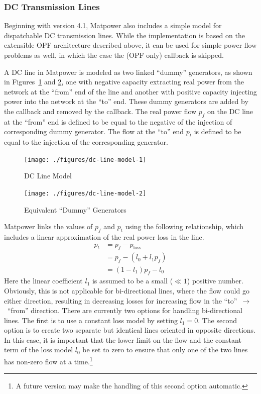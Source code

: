 \documentclass[12pt]{article}
\newcommand{\matpower}[0]{{\sc Matpower}}
\newcommand{\code}[1]{{\relsize{-0.5}{\tt{{#1}}}}}  %
\numberwithin{equation}{section}
\numberwithin{table}{section}
\numberwithin{figure}{section}
\begin{document}
\subsubsection{DC Transmission Lines}
\label{sec:dclines}

Beginning with version 4.1, \matpower{} also includes a simple model for dispatchable DC transmission lines. While the implementation is based on the extensible OPF architecture described above, it can be used for simple power flow problems as well, in which the case the (OPF only) \code{formulation} callback is skipped.

A DC line in \matpower{} is modeled as two linked ``dummy'' generators, as shown in Figures~\ref{fig:dcline_model1} and \ref{fig:dcline_model2}, one with negative capacity extracting real power from the network at the ``from'' end of the line and another with positive capacity injecting power into the network at the ``to'' end. These dummy generators are added by the \code{ext2int} callback and removed by the \code{int2ext} callback. The real power flow $p_f$ on the DC line at the ``from'' end is defined to be equal to the negative of the injection of corresponding dummy generator. The flow at the ``to'' end $p_t$ is defined to be equal to the injection of the corresponding generator.

\begin{figure}[tp]
  \centering
  \texttt{[image: ./figures/dc-line-model-1]}
  \caption{DC Line Model}
  \label{fig:dcline_model1}
\end{figure}

\begin{figure}[tp]
  \centering
  \texttt{[image: ./figures/dc-line-model-2]}
  \caption{Equivalent ``Dummy'' Generators}
  \label{fig:dcline_model2}
\end{figure}

\matpower{} links the values of $p_f$ and $p_t$ using the following relationship, which includes a linear approximation of the real power loss in the line.
\begin{align}
p_t &= p_f - p_\mathrm{loss} \nonumber \\
    &= p_f - (l_0 + l_1 p_f) \nonumber \\
    &= (1 - l_1) p_f - l_0 \label{eq:dclineloss}
\end{align}
Here the linear coefficient $l_1$ is assumed to be a small ($\ll 1$) positive number. Obviously, this is not applicable for bi-directional lines, where the flow could go either direction, resulting in decreasing losses for increasing flow in the ``to''~$\rightarrow$~``from'' direction. There are currently two options for handling bi-directional lines. The first is to use a constant loss model by setting $l_1 = 0$. The second option is to create two separate but identical lines oriented in opposite directions. In this case, it is important that the lower limit on the flow and the constant term of the loss model $l_0$ be set to zero to ensure that only one of the two lines has non-zero flow at a time.\footnote{A future version may make the handling of this second option automatic.}
\end{document}
